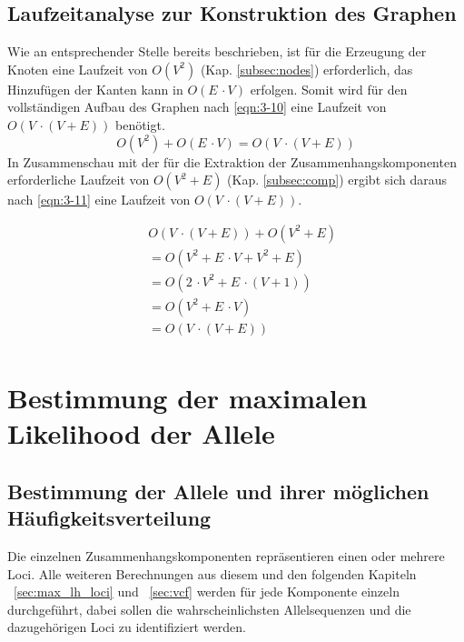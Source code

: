 \subsection{Laufzeitanalyse zur Konstruktion des Graphen} \label{subsec:runtime_graph}
Wie an entsprechender Stelle bereits beschrieben, ist für die Erzeugung der Knoten eine Laufzeit von $ O(V^2) $ (Kap. \ref{subsec:nodes}) erforderlich, das Hinzufügen der Kanten kann in $ O(E\, \cdotp V) $ erfolgen. Somit wird für den vollständigen Aufbau des Graphen nach \eqref{eqn:3-10} eine Laufzeit von $ O(V \, \cdotp (V+E)) $ benötigt. \\
\begin{equation} \label{eqn:3-10}
\tag{3-10}
O(V^2) + O(E\, \cdotp V) = O(V \, \cdotp (V+E))
\end{equation}
In Zusammenschau mit der für die Extraktion der Zusammenhangskomponenten erforderliche Laufzeit von $ O(V^2 + E) $ (Kap. \ref{subsec:comp}) ergibt sich daraus nach  \eqref{eqn:3-11} eine Laufzeit von $ O(V \, \cdotp (V + E)) $. 

\begin{equation} \label{eqn:3-11}
\tag{3-11}
\begin{aligned}
&\ {} O(V \, \cdotp (V+E)) +O(V^2 + E) \\
& \ = O(V^2 + E \, \cdotp V + V^2 + E)\\
&\ = O(2 \, \cdotp V^2 + E \, \cdotp (V + 1)) \\
&\ = O(V^2 + E \, \cdotp V)\\
&\ = O(V \, \cdotp (V + E))\\
\end{aligned}
\end{equation}

\section{Bestimmung der maximalen Likelihood der Allele} \label{sec:max_lh_allele}
\subsection{Bestimmung der Allele und ihrer möglichen Häufigkeitsverteilung} \label{subsec:cand_allele}

Die einzelnen Zusammenhangskomponenten repräsentieren einen oder mehrere Loci. Alle weiteren Berechnungen aus diesem und den folgenden Kapiteln ~\ref{sec:max_lh_loci} und ~\ref{sec:vcf} werden für jede Komponente einzeln durchgeführt, dabei sollen die wahrscheinlichsten Allelsequenzen und die dazugehörigen Loci zu identifiziert werden.\\

